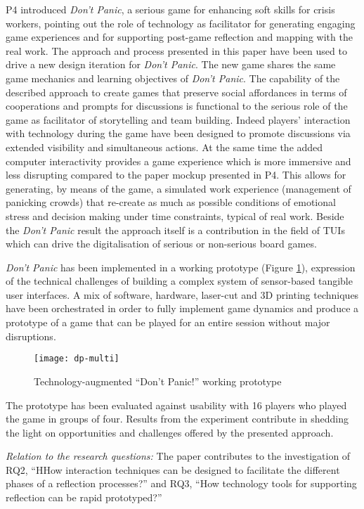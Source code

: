 P4 introduced \emph{Don't Panic}, a serious game for enhancing soft skills for crisis workers, pointing out the role of technology as facilitator for generating engaging game experiences and for supporting post-game reflection and mapping with the real work. The approach and process presented in this paper have been used to drive a new design iteration for \emph{Don't Panic}. The new game shares the same game mechanics and learning objectives of \emph{Don't Panic}. The capability of the described approach to create games that preserve social affordances in terms of cooperations and prompts for discussions is functional to the serious role of the game as facilitator of storytelling and team building. Indeed players' interaction with technology during the game have been designed to promote discussions via extended visibility and simultaneous actions. At the same time the added computer interactivity provides a game experience which is more immersive and less disrupting compared to the paper mockup presented in P4. This allows for generating, by means of the game, a simulated work experience (management of panicking crowds) that re-create as much as possible conditions of emotional stress and decision making under time constraints, typical of real work. Beside the \emph{Don't Panic} result the approach itself is a contribution in the field of TUIs which can drive the digitalisation of serious or non-serious board games.

\emph{Don't Panic} has been implemented in a working prototype (Figure \ref{fig:dp-token}), expression of the technical challenges of building a complex system of sensor-based tangible user interfaces. A mix of software, hardware, laser-cut and 3D printing techniques have been orchestrated in order to fully implement game dynamics and produce a prototype of a game that can be played for an entire session without major disruptions.
\begin{figure}
	[tbh] \centering 
	\texttt{[image: dp-multi]} \caption{Technology-augmented “Don't Panic!” working prototype} \label{fig:dp-token} 
\end{figure}

The prototype has been evaluated against usability with 16 players who played the game in groups of four. Results from the experiment contribute in shedding the light on opportunities and challenges offered by the presented approach.

\emph{Relation to the research questions: } The paper contributes to the investigation of RQ2, ``HHow interaction techniques can be designed to facilitate the different phases of a reflection processes?'' and RQ3, ``How technology tools for supporting reflection can be rapid prototyped?''

